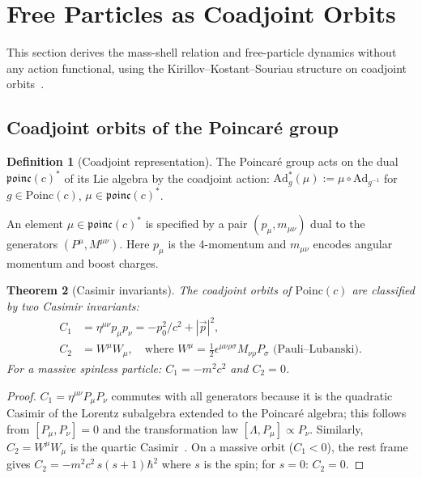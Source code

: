 \documentclass[12pt]{article}
\theoremstyle{plain}
\newtheorem{theorem}{Theorem}[section]
\theoremstyle{definition}
\newtheorem{definition}[theorem]{Definition}
\theoremstyle{remark}
\newcommand{\Poinc}{\mathrm{Poinc}}
\newcommand{\Ad}{\mathrm{Ad}}
\begin{document}
\section{Free Particles as Coadjoint Orbits}
\label{sec:coadjoint}

This section derives the mass-shell relation and free-particle dynamics without any action functional, using the Kirillov--Kostant--Souriau structure on coadjoint orbits~\cite{souriau1970,kirillov1976,kostant1970}.

\subsection{Coadjoint orbits of the Poincar\'e group}

\begin{definition}[Coadjoint representation]\label{def:coadjoint}
The Poincar\'e group acts on the dual $\mathfrak{poinc}(c)^*$ of its Lie algebra by the coadjoint action: $\Ad^*_g(\mu) := \mu \circ \Ad_{g^{-1}}$ for $g \in \Poinc(c)$, $\mu \in \mathfrak{poinc}(c)^*$.
\end{definition}

An element $\mu \in \mathfrak{poinc}(c)^*$ is specified by a pair $(p_\mu, m_{\mu\nu})$ dual to the generators $(P^\mu, M^{\mu\nu})$. Here $p_\mu$ is the 4-momentum and $m_{\mu\nu}$ encodes angular momentum and boost charges.

\begin{theorem}[Casimir invariants]\label{thm:casimirs}
The coadjoint orbits of $\Poinc(c)$ are classified by two Casimir invariants:
\begin{align}
C_1 &= \eta^{\mu\nu}p_\mu p_\nu = -p_0^2/c^2 + |\vec{p}|^2, \label{eq:C1}\\
C_2 &= W^\mu W_\mu, \quad \text{where } W^\mu = \tfrac{1}{2}\epsilon^{\mu\nu\rho\sigma}M_{\nu\rho}P_\sigma \text{ (Pauli--Lubanski)}. \label{eq:C2}
\end{align}
For a massive spinless particle: $C_1 = -m^2c^2$ and $C_2 = 0$.
\end{theorem}

\begin{proof}
$C_1 = \eta^{\mu\nu}P_\mu P_\nu$ commutes with all generators because it is the quadratic Casimir of the Lorentz subalgebra extended to the Poincar\'e algebra; this follows from $[P_\mu, P_\nu] = 0$ and the transformation law $[\Lambda, P_\mu] \propto P_\nu$. Similarly, $C_2 = W^\mu W_\mu$ is the quartic Casimir~\cite{wigner1939}. On a massive orbit ($C_1 < 0$), the rest frame gives $C_2 = -m^2c^2\,s(s+1)\hbar^2$ where $s$ is the spin; for $s = 0$: $C_2 = 0$.
\end{proof}
\end{document}
